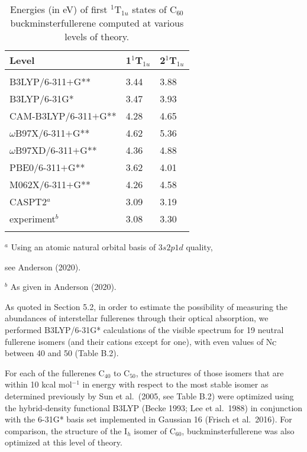 \documentclass{aa}
\begin{document}
\begin{table}[htbp]
      \caption[]{Energies (in eV) of first $^1$T$_{1u}$  states of C$_{60}$ buckminsterfullerene computed at various levels of theory.}
         \label{tab:lines}
            \begin{tabular}{ l l l }
            \hline
           \noalign{\smallskip}
Level &  1$^1$T$_{1u}$  &  2$^1$T$_{1u}$ \\
          \hline
& & \\
B3LYP/6-311$+$G**              &  3.44   &  3.88 \\
B3LYP/6-31G*                &  3.47      &  3.93 \\
CAM-B3LYP/6-311$+$G** & 4.28      &     4.65 \\
$\omega$B97X/6-311$+$G**               &  4.62   &  5.36 \\
$\omega$B97XD/6-311$+$G**        & 4.36       &  4.88 \\
PBE0/6-311$+$G**              &  3.62    &  4.01 \\
M062X/6-311$+$G**      &        4.26     &  4.58 \\
CASPT2$^a$                 &   3.09      &  3.19 \\ 
experiment$^b$        &  3.08    &  3.30 \\
      \noalign{\smallskip}
            \hline
           \end{tabular}
{\small \begin{list}{}{} 
\item[$^a$ Using an atomic natural orbital basis of $3s2p1d$ quality,] 
\item[see Anderson (2020).] 
\item[$^b$ As given in Anderson (2020).] 
\end{list}}
\end{table}

As quoted in Section 5.2, in order to estimate the possibility of measuring the abundances of  interstellar fullerenes through their optical absorption, 
we performed B3LYP/6-31G* calculations of the visible spectrum for 19 neutral fullerene isomers (and their cations except for one), with even values of N$_{\rm C}$ between 40 and 50 (Table B.2).  

For each of the fullerenes C$_{40}$ to C$_{50}$, the structures of those isomers that are within 10 kcal mol$^{-1}$ in energy with respect to the most stable isomer as determined previously by Sun et al.\ (2005, see Table B.2) were optimized using the hybrid-density functional B3LYP (Becke 1993; Lee et al.\ 1988) in conjunction with the 6-31G* basis set implemented in Gaussian 16 (Frisch et al.\ 2016). For comparison, the structure of the I$_h$ isomer of C$_{60}$, buckminsterfullerene was also optimized at 
this level of theory.
\end{document}
